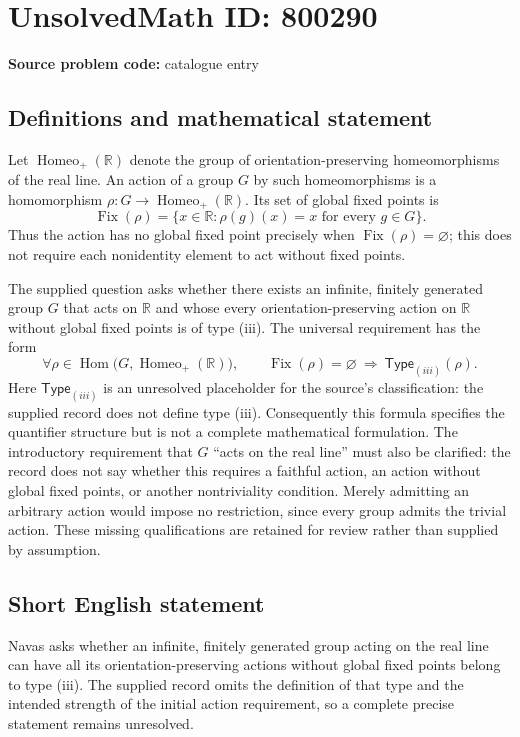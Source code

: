 \documentclass[11pt]{article}
\newcommand{\R}{\mathbb{R}}
\begin{document}
\section*{UnsolvedMath ID: 800290}
\textbf{Source problem code:} catalogue entry
\subsection{Definitions and mathematical statement}
Let \(\operatorname{Homeo}_{+}(\R)\) denote the group of orientation-preserving homeomorphisms of the real line. An action of a group \(G\) by such homeomorphisms is a homomorphism \(\rho\colon G\to\operatorname{Homeo}_{+}(\R)\). Its set of global fixed points is
\[
\operatorname{Fix}(\rho)=\{x\in\R:\rho(g)(x)=x\text{ for every }g\in G\}.
\]
Thus the action has no global fixed point precisely when \(\operatorname{Fix}(\rho)=\varnothing\); this does not require each nonidentity element to act without fixed points.

The supplied question asks whether there exists an infinite, finitely generated group \(G\) that acts on \(\R\) and whose every orientation-preserving action on \(\R\) without global fixed points is of type (iii). The universal requirement has the form
\[
\forall\rho\in\operatorname{Hom}\bigl(G,\operatorname{Homeo}_{+}(\R)\bigr),\qquad
\operatorname{Fix}(\rho)=\varnothing
\ \Longrightarrow\ 
\mathsf{Type}_{(iii)}(\rho).
\]
Here \(\mathsf{Type}_{(iii)}\) is an unresolved placeholder for the source's classification: the supplied record does not define type (iii). Consequently this formula specifies the quantifier structure but is not a complete mathematical formulation. The introductory requirement that \(G\) ``acts on the real line'' must also be clarified: the record does not say whether this requires a faithful action, an action without global fixed points, or another nontriviality condition. Merely admitting an arbitrary action would impose no restriction, since every group admits the trivial action. These missing qualifications are retained for review rather than supplied by assumption.
\subsection{Short English statement}
Navas asks whether an infinite, finitely generated group acting on the real line can have all its orientation-preserving actions without global fixed points belong to type (iii). The supplied record omits the definition of that type and the intended strength of the initial action requirement, so a complete precise statement remains unresolved.
\end{document}
